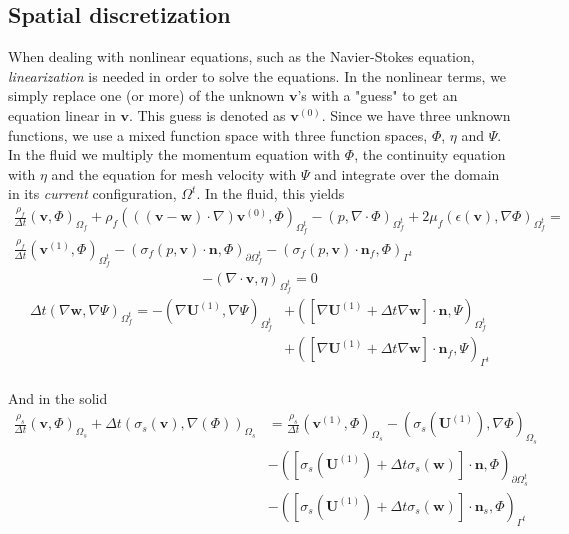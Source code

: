 \subsection{Spatial discretization}
When dealing with nonlinear equations, such as the Navier-Stokes equation, \textit{linearization} is needed in order to solve the equations. In the nonlinear terms, we simply replace one (or more) of the unknown $\mathbf{v}$'s with a "guess" to get an equation linear in $\mathbf{v}$. This guess is denoted as $\mathbf{v}^{(0)}$. Since we have three unknown functions, we use a mixed function space with three function spaces, $\Phi$, $\eta$ and $\Psi$. In the fluid we multiply the momentum equation with $\Phi$, the continuity equation with $\eta$ and the equation for mesh velocity with $\Psi$ and integrate over the domain in its \textit{current} configuration, $\Omega^t$. In the fluid, this yields
\begin{align}
\frac{\rho_f}{\Delta t}(\mathbf{v},\Phi)_{\Omega_f} + \rho_f(((\mathbf{v}-\mathbf{w})\cdot \nabla) \mathbf{v}^{(0)}, \Phi)_{\Omega_f^t} - (p,\nabla \cdot \Phi)_{\Omega_f^t} + 2\mu_f(\epsilon(\mathbf{v}), \nabla \Phi)_{\Omega_f^t} = \\ 
\frac{\rho_f}{\Delta t}(\mathbf{v}^{(1)},\Phi)_{\Omega_f^t} - (\sigma_f(p,\mathbf{v})\cdot \mathbf{n}, \Phi)_{\partial \Omega_f^t} - (\sigma_f(p,\mathbf{v}) \cdot \mathbf{n}_f, \Phi)_{\Gamma^t} \label{VarMom}
\end{align}
\begin{align}
-(\nabla \cdot \mathbf{v},\eta)_{\Omega_f^t} = 0 \label{VarCon}
\end{align}
\begin{align}
\Delta t(\nabla \mathbf{w}, \nabla \Psi)_{\Omega_f^t} = - (\nabla \mathbf{U}^{(1)}, \nabla \Psi)_{\Omega_f^t} & + ([\nabla \mathbf{U}^{(1)} + \Delta t \nabla \mathbf{w}] \cdot \mathbf{n}, \Psi)_{\Omega_f^t} \\ 
& + ([\nabla \mathbf{U}^{(1)} + \Delta t \nabla \mathbf{w}] \cdot \mathbf{n}_f, \Psi)_{\Gamma^t} \label{VarMesh}
\end{align}
\\
And in the solid
\begin{align}
\frac{\rho_s}{\Delta t}(\mathbf{v},\Phi)_{\Omega_s} + \Delta t (\sigma_s (\mathbf{v}), \nabla(\Phi))_{\Omega_s} & = \frac{\rho_s}{\Delta t}(\mathbf{v}^{(1)},\Phi)_{\Omega_s} - (\sigma_s(\mathbf{U}^{(1)}), \nabla \Phi)_{\Omega_s} \\
& - ([\sigma_s(\mathbf{U}^{(1)}) + \Delta t \sigma_s(\mathbf{w})]\cdot \mathbf{n}, \Phi)_{\partial \Omega_s^t} \\
& - ([\sigma_s(\mathbf{U}^{(1)}) + \Delta t \sigma_s(\mathbf{w})]\cdot \mathbf{n}_s, \Phi)_{\Gamma^t} \label{VarMom2}
\end{align}
